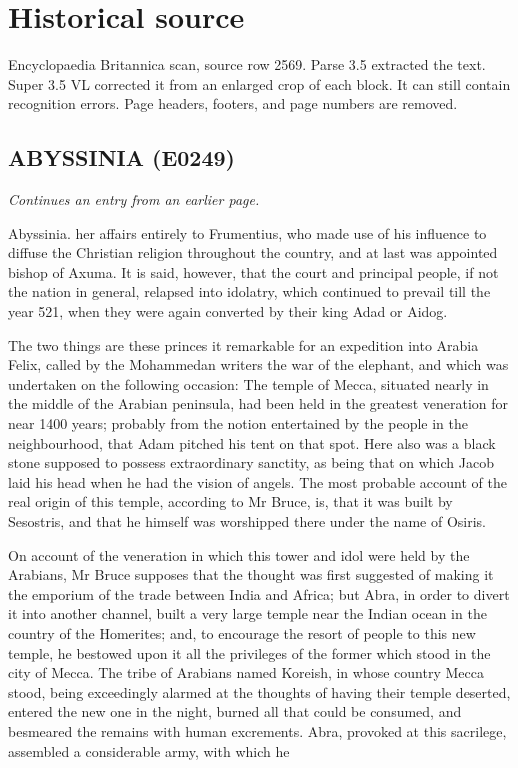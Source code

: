 \documentclass{article}
\begin{document}
\section*{Historical source}
Encyclopaedia Britannica scan, source row 2569. Parse 3.5 extracted the text. Super 3.5 VL corrected it from an enlarged crop of each block. It can still contain recognition errors.
Page headers, footers, and page numbers are removed.

\subsection*{ABYSSINIA (E0249)}
\textit{Continues an entry from an earlier page.}

Abyssinia. her affairs entirely to Frumentius, who made use of his influence to diffuse the Christian religion throughout the country, and at last was appointed bishop of Axuma. It is said, however, that the court and principal people, if not the nation in general, relapsed into idolatry, which continued to prevail till the year 521, when they were again converted by their king Adad or Aidog.

The two things are these princes it remarkable for an expedition into Arabia Felix, called by the Mohammedan writers the war of the elephant, and which was undertaken on the following occasion: The temple of Mecca, situated nearly in the middle of the Arabian peninsula, had been held in the greatest veneration for near 1400 years; probably from the notion entertained by the people in the neighbourhood, that Adam pitched his tent on that spot. Here also was a black stone supposed to possess extraordinary sanctity, as being that on which Jacob laid his head when he had the vision of angels. The most probable account of the real origin of this temple, according to Mr Bruce, is, that it was built by Sesostris, and that he himself was worshipped there under the name of Osiris.

On account of the veneration in which this tower and idol were held by the Arabians, Mr Bruce supposes that the thought was first suggested of making it the emporium of the trade between India and Africa; but Abra, in order to divert it into another channel, built a very large temple near the Indian ocean in the country of the Homerites; and, to encourage the resort of people to this new temple, he bestowed upon it all the privileges of the former which stood in the city of Mecca. The tribe of Arabians named Koreish, in whose country Mecca stood, being exceedingly alarmed at the thoughts of having their temple deserted, entered the new one in the night, burned all that could be consumed, and besmeared the remains with human excrements. Abra, provoked at this sacrilege, assembled a considerable army, with which he
\end{document}
